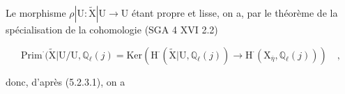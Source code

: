 %
%
%
%
%
Le morphisme $\rho|\mathrm{U} : \widetilde{\mathrm{X}}|\mathrm{U} \longrightarrow \mathrm{U}$ étant propre et lisse, on a, par le théorème de la spécialisation de la cohomologie (SGA 4 XVI 2.2)

\begin{equation}\tag{5.8.2.2}
\mathrm{Prim}^{\cdot}(\widetilde{\mathrm{X}}|\mathrm{U}/\mathrm{U},\mathbb{Q}_\ell(j) = \mathrm{Ker}(\mathrm{H}^{\cdot}(\widetilde{\mathrm{X}}|\mathrm{U},\mathbb{Q}_\ell(j)) \longrightarrow \mathrm{H}^{\cdot}(\mathrm{X}_{\overline{\eta}},\mathbb{Q}_\ell(j))) \quad ,
\end{equation}

donc, d'après (5.2.3.1), on a

